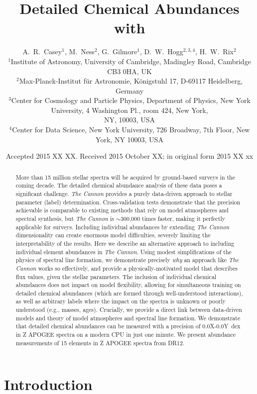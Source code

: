 \documentclass[useAMS,usenatbib]{mn2e}
\title[Cannon Chemistry]{Detailed Chemical Abundances with \tc{}}
\author[Casey et al.]{A.~R.~Casey$^1$, M.~Ness$^2$, G.~Gilmore$^1$,
    D.~W.~Hogg$^{2,3,4}$, H.~W.~Rix$^2$ \\ 
$^1$Institute of Astronomy, University of Cambridge, Madingley Road, Cambridge
    CB3 0HA, UK\\
$^2$Max-Planck-Institut f\"ur Astronomie, K\"onigstuhl 17, D-69117 Heidelberg,
    Germany\\
$^3$Center for Cosmology and Particle Physics, Department of Physics, New York
    University, 4 Washington Pl., room 424, New York, \\
    NY, 10003, USA\\
$^4$Center for Data Science, New York University, 726 Broadway, 7th Floor,
    New York, NY 10003, USA}
\newcommand\tc{\textit{The Cannon}}
\begin{document}
\date{Accepted 2015 XX XX. Received 2015 October XX; in original form 2015 XX xx}

\pagerange{\pageref{firstpage}--\pageref{lastpage}} 

\maketitle

\label{firstpage}

\begin{abstract}
More than 15 million stellar spectra will be acquired by ground-based surveys in
the coming decade. The detailed chemical abundance analysis of these data poses
a significant challenge. \tc{} provides a purely data-driven
approach to stellar parameter (label) determination. Cross-validation tests
demonstrate that the precision achievable is comparable to existing methods that
rely on model atmospheres and spectral synthesis, but \tc{} is $\sim$300,000 times
faster, making it perfectly applicable for surveys. Including individual abundances by extending \tc{} dimensionality can create enormous model difficulties, severely limiting the interpretability of the results. Here
we describe an alternative approach to including individual element abundances
in \tc{}. Using modest simplifications of the physics of spectral line formation,
we demonstrate precisely \textit{why} an approach like \tc{} works so effectively,
and provide a physically-motivated model that describes flux values, given the
stellar parameters. The inclusion of individual chemical abundances does not
impact on model flexibility, allowing for simultaneous training on detailed
chemical abundances (which are formed through well-understood interactions), as well as arbitrary labels where the impact on the spectra
is unknown or poorly understood (e.g., masses, ages). Crucially, we provide a direct link
between data-driven models and theory of model atmospheres and spectral line formation. We demonstrate that
detailed chemical abundances can be measured with a precision of 0.0X-0.0Y~dex
in Z APOGEE spectra on a modern CPU in just one minute. We present abundance
measurements of 15 elements in Z APOGEE spectra from DR12.
\end{abstract}

\begin{keywords}
\end{keywords}

\section{Introduction}
\label{sec:introduction}
\end{document}
